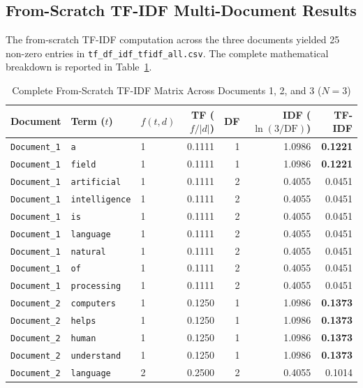 \documentclass[12pt,a4paper]{report}
\begin{document}
\subsection{From-Scratch TF-IDF Multi-Document Results}
The from-scratch TF-IDF computation across the three documents yielded 25 non-zero entries in \texttt{tf\_df\_idf\_tfidf\_all.csv}. The complete mathematical breakdown is reported in Table~\ref{tab:exp4_tfidf_complete}.
\begin{table}[H]
\centering
\small
\caption{Complete From-Scratch TF-IDF Matrix Across Documents 1, 2, and 3 ($N=3$)}
\label{tab:exp4_tfidf_complete}
\begin{tabularx}{\textwidth}{lllrrrr}
\toprule
\textbf{Document} & \textbf{Term ($t$)} & \textbf{$f(t, d)$} & \textbf{TF ($f/|d|$)} & \textbf{DF} & \textbf{IDF ($\ln(3/\text{DF})$)} & \textbf{TF-IDF} \\
\midrule
\texttt{Document\_1} & \texttt{a} & 1 & 0.1111 & 1 & 1.0986 & \textbf{0.1221} \\
\texttt{Document\_1} & \texttt{field} & 1 & 0.1111 & 1 & 1.0986 & \textbf{0.1221} \\
\texttt{Document\_1} & \texttt{artificial} & 1 & 0.1111 & 2 & 0.4055 & 0.0451 \\
\texttt{Document\_1} & \texttt{intelligence} & 1 & 0.1111 & 2 & 0.4055 & 0.0451 \\
\texttt{Document\_1} & \texttt{is} & 1 & 0.1111 & 2 & 0.4055 & 0.0451 \\
\texttt{Document\_1} & \texttt{language} & 1 & 0.1111 & 2 & 0.4055 & 0.0451 \\
\texttt{Document\_1} & \texttt{natural} & 1 & 0.1111 & 2 & 0.4055 & 0.0451 \\
\texttt{Document\_1} & \texttt{of} & 1 & 0.1111 & 2 & 0.4055 & 0.0451 \\
\texttt{Document\_1} & \texttt{processing} & 1 & 0.1111 & 2 & 0.4055 & 0.0451 \\
\midrule
\texttt{Document\_2} & \texttt{computers} & 1 & 0.1250 & 1 & 1.0986 & \textbf{0.1373} \\
\texttt{Document\_2} & \texttt{helps} & 1 & 0.1250 & 1 & 1.0986 & \textbf{0.1373} \\
\texttt{Document\_2} & \texttt{human} & 1 & 0.1250 & 1 & 1.0986 & \textbf{0.1373} \\
\texttt{Document\_2} & \texttt{understand} & 1 & 0.1250 & 1 & 1.0986 & \textbf{0.1373} \\
\texttt{Document\_2} & \texttt{language} & 2 & 0.2500 & 2 & 0.4055 & 0.1014 \\

\end{tabularx}
\end{table}
\end{document}
